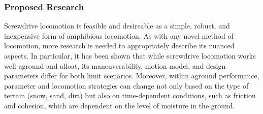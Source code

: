 



\subsubsection{Proposed Research}



Screwdrive locomotion is feasible and desireable as a simple, robust, and inexpensive form of amphibious locomotion. As with any novel method of locomotion, more research is needed to appropriately describe its nuanced aspects. In particular, it has been shown that while screwdrive locomotion works well aground and afloat, its maneuverability, motion model, and design parameters differ for both limit scenarios. Moreover, within aground performance, parameter and locomotion strategies can change not only based on the type of terrain (snow, sand, dirt) but also on time-dependent conditions, such as friction and cohesion, which are dependent on the level of moisture in the ground.

